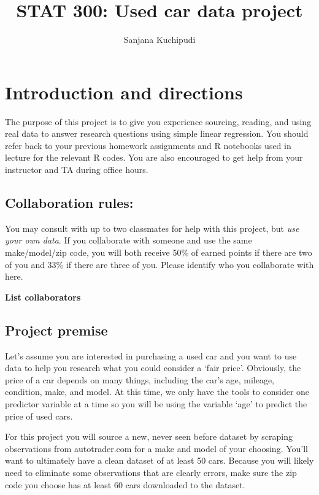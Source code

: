 \documentclass[
]{article}
\title{STAT 300: Used car data project}
\author{Sanjana Kuchipudi}
\date{}
\begin{document}
\maketitle

\hypertarget{introduction-and-directions}{%
\section{Introduction and
directions}\label{introduction-and-directions}}

The purpose of this project is to give you experience sourcing, reading,
and using real data to answer research questions using simple linear
regression. You should refer back to your previous homework assignments
and R notebooks used in lecture for the relevant R codes. You are also
encouraged to get help from your instructor and TA during office hours.

\hypertarget{collaboration-rules}{%
\subsection{Collaboration rules:}\label{collaboration-rules}}

You may consult with up to two classmates for help with this project,
but \emph{use your own data}. If you collaborate with someone and use
the same make/model/zip code, you will both receive 50\% of earned
points if there are two of you and 33\% if there are three of you.
Please identify who you collaborate with here.

\textbf{List collaborators}

\hypertarget{project-premise}{%
\subsection{Project premise}\label{project-premise}}

Let's assume you are interested in purchasing a used car and you want to
use data to help you research what you could consider a `fair price'.
Obviously, the price of a car depends on many things, including the
car's age, mileage, condition, make, and model. At this time, we only
have the tools to consider one predictor variable at a time so you will
be using the variable `age' to predict the price of used cars.

For this project you will source a new, never seen before dataset by
scraping observations from autotrader.com for a make and model of your
choosing. You'll want to ultimately have a clean dataset of at least 50
cars. Because you will likely need to eliminate some observations that
are clearly errors, make sure the zip code you choose has at least 60
cars downloaded to the dataset.
\end{document}
